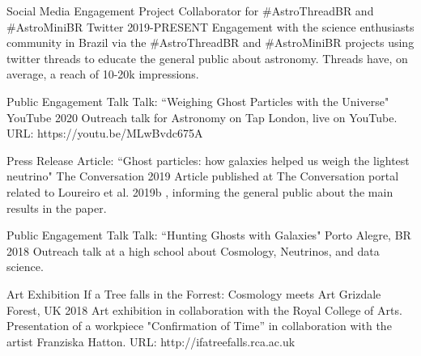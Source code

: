 

\begin{cventries}
    
  \cventry
    {Social Media Engagement} %
    {Project Collaborator for \#AstroThreadBR and \#AstroMiniBR } %
    {Twitter} %
    {2019-PRESENT} %
    {
      {Engagement with the science enthusiasts community in Brazil via the \#AstroThreadBR and \#AstroMiniBR projects using twitter threads to educate the general public about astronomy. Threads have, on average, a reach of 10-20k impressions.}
    }

  \cventry
    {Public Engagement Talk} %
    {Talk: ``Weighing Ghost Particles with the Universe"} %
    {YouTube} %
    {2020} %
    {
      {Outreach talk for Astronomy on Tap London, live on YouTube. URL: https://youtu.be/MLwBvdc675A}
    }

  
  \cventry
    {Press Release} %
    {Article: ``Ghost particles: how galaxies helped us weigh the lightest neutrino"} %
    {The Conversation} %
    {2019} %
    {
      {Article published at The Conversation portal related to Loureiro et al. 2019b , informing the general public about the main results in the paper.}
    }


 \cventry
    {Public Engagement Talk} %
    {Talk: ``Hunting Ghosts with Galaxies"} %
    {Porto Alegre, BR} %
    {2018} %
    {
      {Outreach talk at a high school about Cosmology, Neutrinos, and data science.}
    }

  \cventry
    {Art Exhibition} %
    {If a Tree falls in the Forrest: Cosmology meets Art} %
    {Grizdale Forest, UK} %
    {2018} %
    {
      {Art exhibition in collaboration with the Royal College of Arts. Presentation of a workpiece "Confirmation of Time” in collaboration with the artist Franziska Hatton. URL: http://ifatreefalls.rca.ac.uk}
    }


\end{cventries}
